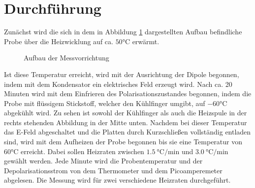 \section{Durchführung}
Zunächst wird die sich in dem in Abbildung \ref{fig:aufb}
dargestellten Aufbau befindliche Probe über die Heizwicklung auf ca. $50° \text{C}$ erwärmt.\\
\begin{figure}
\caption{Aufbau der Messvorrichtung \cite{V48}}
\label{fig:aufb}
\end{figure}
Ist diese Temperatur erreicht, wird mit der Ausrichtung der Dipole begonnen, indem mit dem Kondensator
ein elektrisches Feld erzeugt wird. Nach ca. 20 Minuten wird mit dem Einfrieren des Polarisationszustandes
begonnen,
indem die Probe mit flüssigem Stickstoff, welcher den Kühlfinger umgibt, auf $-60° \text{C}$ abgekühlt wird.
Zu sehen ist sowohl der Kühlfinger als auch die Heizspule in der rechts stehenden Abbildung in der Mitte unten.
Nachdem bei dieser Temperatur das E-Feld abgeschaltet und die Platten
durch Kurzschließen vollständig entladen sind, wird mit dem Aufheizen der Probe begonnen bis sie eine Temperatur von $60°\text{C}$ erreicht.
Dabei sollen Heizraten zwischen $\SI{1.5}{\celsius\per\minute}$ und $\SI{3.0}{\celsius\per\minute}$ gewählt werden. Jede Minute wird die Probentemperatur und
der Depolarisationsstrom von dem Thermometer und dem Picoamperemeter abgelesen.
Die Messung wird für zwei verschiedene Heizraten durchgeführt.
